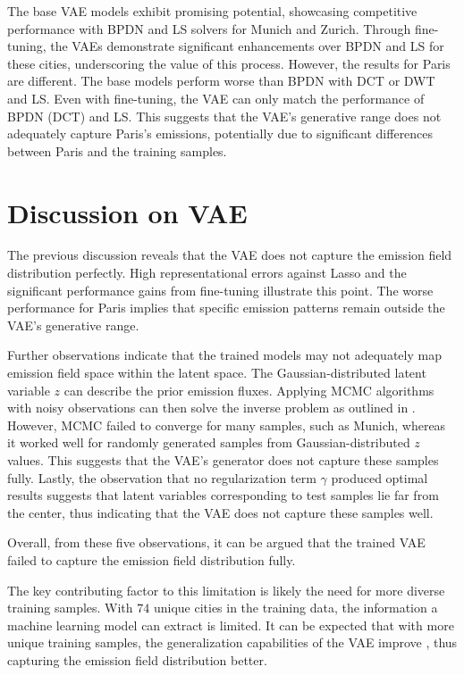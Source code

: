 The base \gls{VAE} models exhibit promising potential, showcasing competitive performance with \gls{BPDN} and \gls{LS} solvers for Munich and Zurich.
Through fine-tuning, the \gls{VAE}s demonstrate significant enhancements over \gls{BPDN} and \gls{LS} for these cities, underscoring the value of this process.
However, the results for Paris are different.
The base models perform worse than \gls{BPDN} with \gls{DCT} or \gls{DWT} and \gls{LS}.
Even with fine-tuning, the \gls{VAE} can only match the performance of \gls{BPDN} (\gls{DCT}) and \gls{LS}.
This suggests that the \gls{VAE}'s generative range does not adequately capture Paris's emissions, potentially due to significant differences between Paris and the training samples.

\section{Discussion on VAE}

The previous discussion reveals that the \gls{VAE} does not capture the emission field distribution perfectly.
High representational errors against \gls{Lasso} and the significant performance gains from fine-tuning illustrate this point.
The worse performance for Paris implies that specific emission patterns remain outside the \gls{VAE}’s generative range.

Further observations indicate that the trained models may not adequately map emission field space within the latent space.
The Gaussian-distributed latent variable $z$ can describe the prior emission fluxes.
Applying \gls{MCMC} \parencite{MCMC} algorithms with noisy observations can then solve the inverse problem as outlined in \cite{VAE-MCMC}.
However, \gls{MCMC} failed to converge for many samples, such as Munich, whereas it worked well for randomly generated samples from Gaussian-distributed $z$ values.
This suggests that the \gls{VAE}’s generator does not capture these samples fully.
Lastly, the observation that no regularization term $\gamma$ produced optimal results suggests that latent variables corresponding to test samples lie far from the center, thus indicating that the \gls{VAE} does not capture these samples well.

Overall, from these five observations, it can be argued that the trained \gls{VAE} failed to capture the emission field distribution fully.

The key contributing factor to this limitation is likely the need for more diverse training samples.
With $74$ unique cities in the training data, the information a machine learning model can extract is limited.
It can be expected that with more unique training samples, the generalization capabilities of the \gls{VAE} improve \parencite{limited-data}, thus capturing the emission field distribution better.

